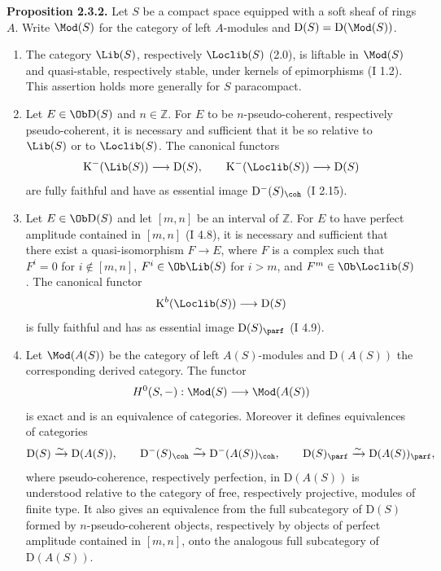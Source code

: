 \textbf{Proposition 2.3.2.} Let $S$ be a compact space equipped with a soft sheaf of rings $A$. Write $\Mod(S)$ for the category of left $A$-modules and $\mathrm D(S)=\mathrm D(\Mod(S))$.
\begin{enumerate}[label=\alph*)]
\item The category $\Lib(S)$, respectively $\Loclib(S)$ (2.0), is liftable in $\Mod(S)$ and quasi-stable, respectively stable, under kernels of epimorphisms (I 1.2). This assertion holds more generally for $S$ paracompact.
\item Let $E\in\Ob\mathrm D(S)$ and $n\in\mathbb Z$. For $E$ to be $n$-pseudo-coherent, respectively pseudo-coherent, it is necessary and sufficient that it be so relative to $\Lib(S)$ or to $\Loclib(S)$. The canonical functors
\[
\mathrm K^{-}(\Lib(S))\longrightarrow \mathrm D(S),
\qquad
\mathrm K^{-}(\Loclib(S))\longrightarrow \mathrm D(S)
\]
are fully faithful and have as essential image $\mathrm D^{-}(S)_{\coh}$ (I 2.15).
\item Let $E\in\Ob\mathrm D(S)$ and let $[m,n]$ be an interval of $\mathbb Z$. For $E$ to have perfect amplitude contained in $[m,n]$ (I 4.8), it is necessary and sufficient that there exist a quasi-isomorphism $F\to E$, where $F$ is a complex such that $F^i=0$ for $i\notin[m,n]$, $F^i\in\Ob\Lib(S)$ for $i>m$, and $F^m\in\Ob\Loclib(S)$. The canonical functor
\[
\mathrm K^b(\Loclib(S))\longrightarrow \mathrm D(S)
\]
is fully faithful and has as essential image $\mathrm D(S)_{\parf}$ (I 4.9).
\item Let $\Mod(A(S))$ be the category of left $A(S)$-modules and $\mathrm D(A(S))$ the corresponding derived category. The functor
\[
H^0(S,-):\Mod(S)\longrightarrow\Mod(A(S))
\]
is exact and is an equivalence of categories. Moreover it defines equivalences of categories
\[
\mathrm D(S)\xrightarrow{\sim}\mathrm D(A(S)),\qquad
\mathrm D^{-}(S)_{\coh}\xrightarrow{\sim}\mathrm D^{-}(A(S))_{\coh},\qquad
\mathrm D(S)_{\parf}\xrightarrow{\sim}\mathrm D(A(S))_{\parf},
\]
where pseudo-coherence, respectively perfection, in $\mathrm D(A(S))$ is understood relative to the category of free, respectively projective, modules of finite type. It also gives an equivalence from the full subcategory of $\mathrm D(S)$ formed by $n$-pseudo-coherent objects, respectively by objects of perfect amplitude contained in $[m,n]$, onto the analogous full subcategory of $\mathrm D(A(S))$.
\end{enumerate}

